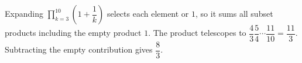 Expanding $\prod_{k=3}^{10}(1+\dfrac{1}{k})$ selects each element or $1$, so it sums all subset products including the empty product $1$. The product telescopes to $\dfrac{4}{3}\dfrac{5}{4}\cdots\dfrac{11}{10}=\dfrac{11}{3}$. Subtracting the empty contribution gives $\boxed{\dfrac{8}{3}}$.
